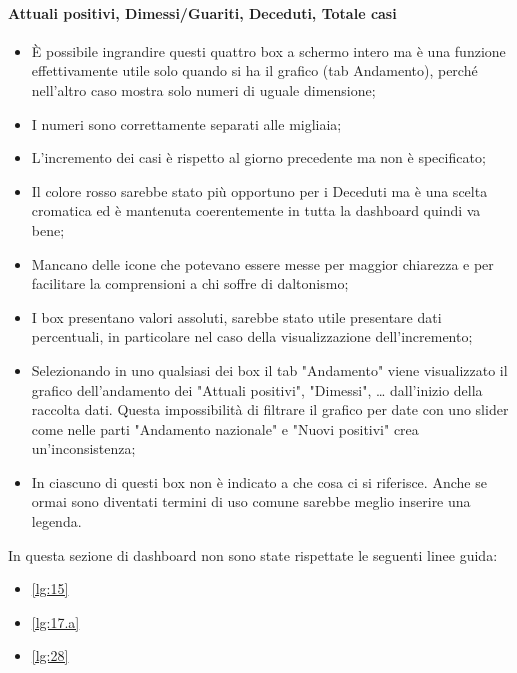\paragraph{Attuali positivi, Dimessi/Guariti, Deceduti, Totale casi}
\begin{itemize}
    \item \`E possibile ingrandire questi quattro box a schermo intero ma è una funzione effettivamente utile solo quando si ha il grafico (tab Andamento), perché nell'altro caso mostra solo numeri di uguale dimensione;
    \item I numeri sono correttamente separati alle migliaia;
    \item L'incremento dei casi è rispetto al giorno precedente ma non è specificato;
    \item Il colore rosso sarebbe stato più opportuno per i Deceduti ma è una scelta cromatica ed è mantenuta coerentemente in tutta la dashboard quindi va bene;
    \item Mancano delle icone che potevano essere messe per maggior chiarezza e per facilitare la comprensioni a chi soffre di daltonismo;
    \item I box presentano valori assoluti, sarebbe stato utile presentare dati percentuali, in particolare nel caso della visualizzazione dell'incremento;
    \item Selezionando in uno qualsiasi dei box il tab "Andamento" viene visualizzato il grafico dell'andamento dei "Attuali positivi", "Dimessi", … dall'inizio della raccolta dati. Questa impossibilità di filtrare il grafico per date con uno slider come nelle parti "Andamento nazionale" e "Nuovi positivi" crea un'inconsistenza;
    \item In ciascuno di questi box non è indicato a che cosa ci si riferisce. Anche se ormai sono diventati termini di uso comune sarebbe meglio inserire una legenda.
\end{itemize}
In questa sezione di dashboard non sono state rispettate le seguenti linee guida:
\begin{itemize}
    \item \ref{lg:15}
    \item \ref{lg:17.a}
    \item \ref{lg:28}
\end{itemize}

